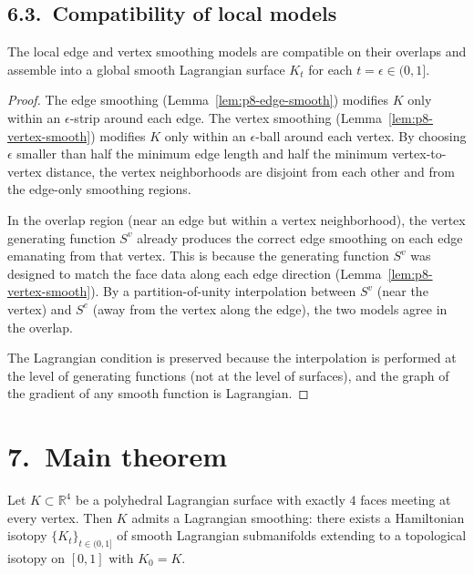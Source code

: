 \subsection*{6.3.\ Compatibility of local models}

\begin{proposition}
\label{prop:p8-patch}
The local edge and vertex smoothing models are compatible on their overlaps
and assemble into a global smooth Lagrangian surface $K_t$ for each
$t=\epsilon\in(0,1]$.
\end{proposition}

\begin{proof}
The edge smoothing (Lemma~\ref{lem:p8-edge-smooth}) modifies $K$ only within
an $\epsilon$-strip around each edge. The vertex smoothing
(Lemma~\ref{lem:p8-vertex-smooth}) modifies $K$ only within an
$\epsilon$-ball around each vertex. By choosing $\epsilon$ smaller than half
the minimum edge length and half the minimum vertex-to-vertex distance, the
vertex neighborhoods are disjoint from each other and from the edge-only
smoothing regions.

In the overlap region (near an edge but within a vertex neighborhood), the
vertex generating function $S^v$ already produces the correct edge smoothing
on each edge emanating from that vertex. This is because the generating
function $S^v$ was designed to match the face data along each edge direction
(Lemma~\ref{lem:p8-vertex-smooth}). By a partition-of-unity interpolation
between $S^v$ (near the vertex) and $S^e$ (away from the vertex along the
edge), the two models agree in the overlap.

The Lagrangian condition is preserved because the interpolation is performed
at the level of generating functions (not at the level of surfaces), and
the graph of the gradient of any smooth function is Lagrangian.
\end{proof}

\section*{7.\ Main theorem}
\label{sec:p8-main}

\begin{theorem}
\label{thm:p8-main}
Let $K\subset\mathbb{R}^4$ be a polyhedral Lagrangian surface with exactly
$4$ faces meeting at every vertex. Then $K$ admits a Lagrangian smoothing:
there exists a Hamiltonian isotopy $\{K_t\}_{t\in(0,1]}$ of smooth
Lagrangian submanifolds extending to a topological isotopy on $[0,1]$ with
$K_0 = K$.
\end{theorem}

